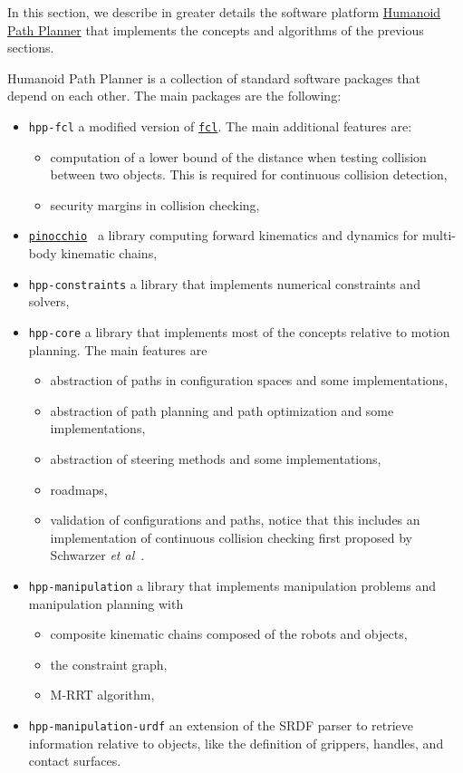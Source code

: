 In this section, we describe in greater details the software platform
\href{https://humanoid-path-planner.github.io/hpp-doc}{Humanoid Path
  Planner} that implements the concepts and algorithms of the previous
sections.

Humanoid Path Planner is a collection of standard software packages that depend
on each other. The main packages are the following:
\begin{itemize}
\item \texttt{hpp-fcl} a modified version of \href{https://github.com/flexible-collision-library/fcl}{\texttt{fcl}}. The main additional features are:
  \begin{itemize}
  \item computation of a lower bound of the distance when testing collision
    between two objects. This is required for continuous collision detection,
  \item security margins in collision checking,
  \end{itemize}
\item \href{https://stack-of-tasks.github.io/pinocchio}{\texttt{pinocchio}}~\cite{pinocchio} a library computing forward kinematics and dynamics for multi-body kinematic chains,
\item \texttt{hpp-constraints} a library that implements numerical constraints
  and solvers,
\item \texttt{hpp-core} a library that implements most of the concepts relative
  to motion planning. The main features are
  \begin{itemize}
  \item abstraction of paths in configuration spaces and some implementations,
  \item abstraction of path planning and path optimization and some implementations,
  \item abstraction of steering methods and some implementations,
  \item roadmaps,
  \item validation of configurations and paths, {\color{blue} notice that this
    includes an implementation of continuous collision checking first proposed
    by Schwarzer \textit{et al}~\cite{SchSahLat2004}.}
  \end{itemize}
\item \texttt{hpp-manipulation} a library that implements manipulation
  problems and manipulation planning with
  \begin{itemize}
    \item composite kinematic chains composed of the robots and objects,
    \item the constraint graph,
    \item M-RRT algorithm,
  \end{itemize}
\item \texttt{hpp-manipulation-urdf} an extension of the SRDF parser to retrieve
  information relative to objects, like the definition of grippers, handles, and
  contact surfaces.
\end{itemize}
